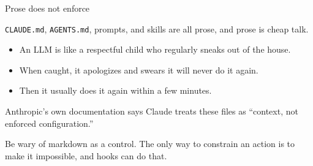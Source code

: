 \documentclass[aspectratio=169,11pt]{beamer}
\begin{document}
\begin{frame}{Prose does not enforce}

\texttt{CLAUDE.md}, \texttt{AGENTS.md}, prompts, and skills are all prose, and prose is cheap talk.

\vspace{0.3cm}

\begin{itemize}\setlength\itemsep{0.35em}
    \item An LLM is like a respectful child who regularly sneaks out of the house.
    \item When caught, it apologizes and swears it will never do it again.
    \item Then it usually does it again within a few minutes.
\end{itemize}

\vspace{0.3cm}

Anthropic's own documentation says Claude treats these files as ``context, not enforced configuration.''

\vspace{0.3cm}

\alert{Be wary of markdown as a control. The only way to constrain an action is to make it impossible, and hooks can do that.}

\end{frame}
\end{document}
